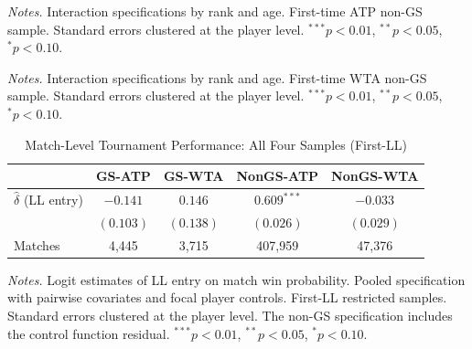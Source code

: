 
\begin{table}[htbp]
\centering
\caption{Non-Grand-Slam Heterogeneity: ATP (First-LL)}
\label{tab:hetero_nongs_atp}
\begin{threeparttable}
\small

\begin{tablenotes}
\footnotesize
\item \textit{Notes.} Interaction specifications by rank and age. First-time ATP non-GS sample. Standard errors clustered at the player level. $^{***}p<0.01$, $^{**}p<0.05$, $^{*}p<0.10$.
\end{tablenotes}
\end{threeparttable}
\end{table}

\begin{table}[htbp]
\centering
\caption{Non-Grand-Slam Heterogeneity: WTA (First-LL)}
\label{tab:hetero_nongs_wta}
\begin{threeparttable}
\small

\begin{tablenotes}
\footnotesize
\item \textit{Notes.} Interaction specifications by rank and age. First-time WTA non-GS sample. Standard errors clustered at the player level. $^{***}p<0.01$, $^{**}p<0.05$, $^{*}p<0.10$.
\end{tablenotes}
\end{threeparttable}
\end{table}


\begin{table}[htbp]
\centering
\caption{Match-Level Tournament Performance: All Four Samples (First-LL)}
\label{tab:delta_all}
\begin{threeparttable}
\small
\begin{tabular}{lcccc}
\toprule
 & GS-ATP & GS-WTA & NonGS-ATP & NonGS-WTA \\
\midrule
$\hat{\delta}$ (LL entry) & $-0.141$ & $0.146$ & $0.609^{***}$ & $-0.033$ \\
 & $(0.103)$ & $(0.138)$ & $(0.026)$ & $(0.029)$ \\[0.3em]
Matches & 4,445 & 3,715 & 407,959 & 47,376 \\
\bottomrule
\end{tabular}
\begin{tablenotes}
\footnotesize
\item \textit{Notes.} Logit estimates of LL entry on match win probability. Pooled specification with pairwise covariates and focal player controls. First-LL restricted samples. Standard errors clustered at the player level. The non-GS specification includes the control function residual. $^{***}p<0.01$, $^{**}p<0.05$, $^{*}p<0.10$.
\end{tablenotes}
\end{threeparttable}
\end{table}

